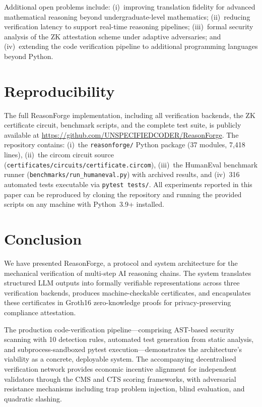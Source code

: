 \documentclass[11pt,a4paper]{article}
\begin{document}
Additional open problems include: (i)~improving translation fidelity for
advanced mathematical reasoning beyond undergraduate-level mathematics;
(ii)~reducing verification latency to support real-time reasoning
pipelines; (iii)~formal security analysis of the ZK attestation scheme
under adaptive adversaries; and (iv)~extending the code verification
pipeline to additional programming languages beyond Python.

\section{Reproducibility}
\label{sec:reproducibility}

The full ReasonForge implementation, including all verification backends,
the ZK certificate circuit, benchmark scripts, and the complete test
suite, is publicly available at
\url{https://github.com/UNSPECIFIEDCODER/ReasonForge}.  The repository
contains: (i)~the \texttt{reasonforge/} Python package (37 modules,
7{,}418 lines), (ii)~the circom circuit source
(\texttt{certificates/circuits/certificate.circom}), (iii)~the HumanEval
benchmark runner (\texttt{benchmarks/run\_humaneval.py}) with archived
results, and (iv)~316 automated tests executable via
\texttt{pytest tests/}.  All experiments reported in this paper can be
reproduced by cloning the repository and running the provided scripts on
any machine with Python~3.9+ installed.

\section{Conclusion}
\label{sec:conclusion}

We have presented ReasonForge, a protocol and system architecture for the
mechanical verification of multi-step AI reasoning chains.  The system
translates structured LLM outputs into formally verifiable
representations across three verification backends, produces
machine-checkable certificates, and encapsulates these certificates in
Groth16 zero-knowledge proofs for privacy-preserving compliance
attestation.

The production code-verification pipeline---comprising AST-based security
scanning with 10 detection rules, automated test generation from static
analysis, and subprocess-sandboxed pytest execution---demonstrates the
architecture's viability as a concrete, deployable system.  The
accompanying decentralised verification network provides economic
incentive alignment for independent validators through the CMS and CTS
scoring frameworks, with adversarial resistance mechanisms including trap
problem injection, blind evaluation, and quadratic slashing.
\end{document}
